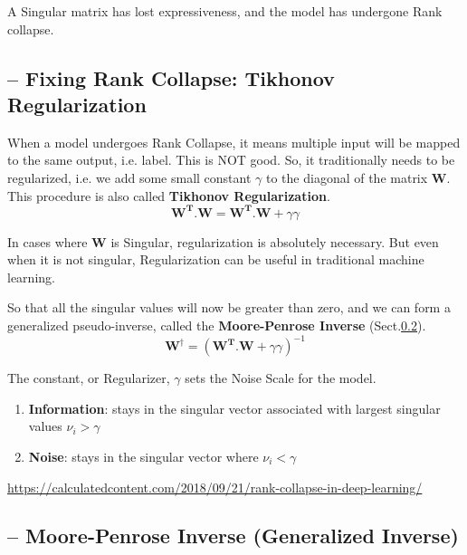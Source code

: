 A Singular matrix has lost expressiveness, and the model has undergone Rank collapse.

\subsection{-- Fixing Rank Collapse: Tikhonov Regularization}

When a model undergoes Rank Collapse, it means multiple input will be mapped to
the same output, i.e. label. This is NOT good.
So, it traditionally needs to be regularized, i.e. we add some small constant
$\gamma$ to the diagonal of the matrix $\mathbf{W}$. This procedure is also
called {\bf Tikhonov Regularization}.  
\begin{equation}
\mathbf{W^T.W} = \mathbf{W^T.W} + \gamma \gamma
\end{equation}

\begin{mdframed}

In cases where $\mathbf{W}$  is Singular, regularization is absolutely necessary.
But even when it is not singular, Regularization can be useful in traditional
machine learning.

\end{mdframed}

So that all the singular values will now be greater than zero, and we can form a
generalized pseudo-inverse, called the {\bf Moore-Penrose Inverse}
(Sect.\ref{sec:Moore-Penrose-inverse}).
\begin{equation}
\mathbf{W}^\dagger = (\mathbf{W^T.W} + \gamma \gamma)^{-1}
\end{equation}

The constant, or Regularizer, $\gamma$ 
sets the Noise Scale for the model.
\begin{enumerate}
  \item {\bf Information}: stays in the singular vector associated with largest singular values $\nu_i > \gamma$
  
  
  \item {\bf Noise}: stays in the singular vector where $\nu_i < \gamma$
\end{enumerate}


\url{https://calculatedcontent.com/2018/09/21/rank-collapse-in-deep-learning/}

\subsection{-- Moore-Penrose Inverse (Generalized Inverse)}
\label{sec:Moore-Penrose-inverse}

